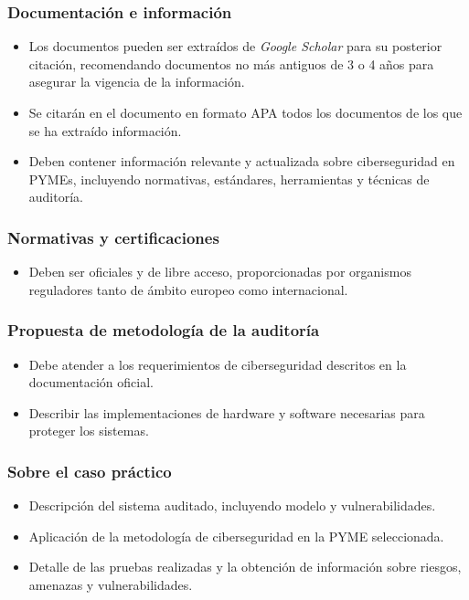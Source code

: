 \documentclass[a4paper, 10pt]{article}
\begin{document}
\subsubsection{Documentación e información}
\begin{itemize}
    \item Los documentos pueden ser extraídos de \textit{Google Scholar} para su posterior citación, recomendando documentos no más antiguos de 3 o 4 años para asegurar la vigencia de la información.
    \item Se citarán en el documento en formato APA todos los documentos de los que se ha extraído información.
    \item Deben contener información relevante y actualizada sobre ciberseguridad en PYMEs, incluyendo normativas, estándares, herramientas y técnicas de auditoría.
\end{itemize}

\subsubsection{Normativas y certificaciones}
\begin{itemize}
    \item Deben ser oficiales y de libre acceso, proporcionadas por organismos reguladores tanto de ámbito europeo como internacional.
\end{itemize}

\subsubsection{Propuesta de metodología de la auditoría}
\begin{itemize}
    \item Debe atender a los requerimientos de ciberseguridad descritos en la documentación oficial.
    \item Describir las implementaciones de hardware y software necesarias para proteger los sistemas.
\end{itemize}

\subsubsection{Sobre el caso práctico}
\begin{itemize}
    \item Descripción del sistema auditado, incluyendo modelo y vulnerabilidades.
    \item Aplicación de la metodología de ciberseguridad en la PYME seleccionada.
    \item Detalle de las pruebas realizadas y la obtención de información sobre riesgos, amenazas y vulnerabilidades.
\end{itemize}
\end{document}
